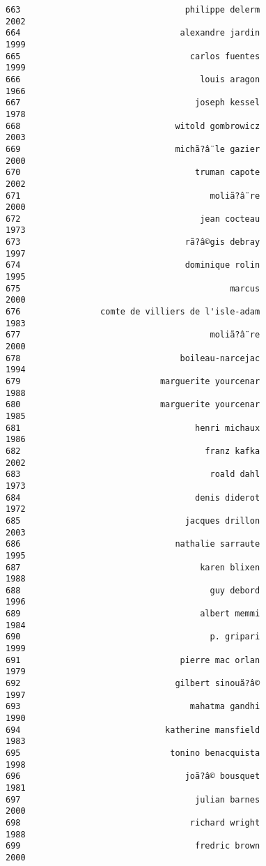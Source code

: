 \documentclass[
]{report}
\begin{document}
\begin{verbatim}
663                                 philippe delerm                2002
664                                alexandre jardin                1999
665                                  carlos fuentes                1999
666                                    louis aragon                1966
667                                   joseph kessel                1978
668                               witold gombrowicz                2003
669                               michã?â¨le gazier                2000
670                                   truman capote                2002
671                                      moliã?â¨re                2000
672                                    jean cocteau                1973
673                                 rã?â©gis debray                1997
674                                 dominique rolin                1995
675                                          marcus                2000
676                comte de villiers de l'isle-adam                1983
677                                      moliã?â¨re                2000
678                                boileau-narcejac                1994
679                            marguerite yourcenar                1988
680                            marguerite yourcenar                1985
681                                   henri michaux                1986
682                                     franz kafka                2002
683                                      roald dahl                1973
684                                   denis diderot                1972
685                                 jacques drillon                2003
686                               nathalie sarraute                1995
687                                    karen blixen                1988
688                                      guy debord                1996
689                                    albert memmi                1984
690                                      p. gripari                1999
691                                pierre mac orlan                1979
692                               gilbert sinouã?â©                1997
693                                  mahatma gandhi                1990
694                             katherine mansfield                1983
695                              tonino benacquista                1998
696                                 joã?â© bousquet                1981
697                                   julian barnes                2000
698                                  richard wright                1988
699                                   fredric brown                2000

\end{verbatim}
\end{document}
